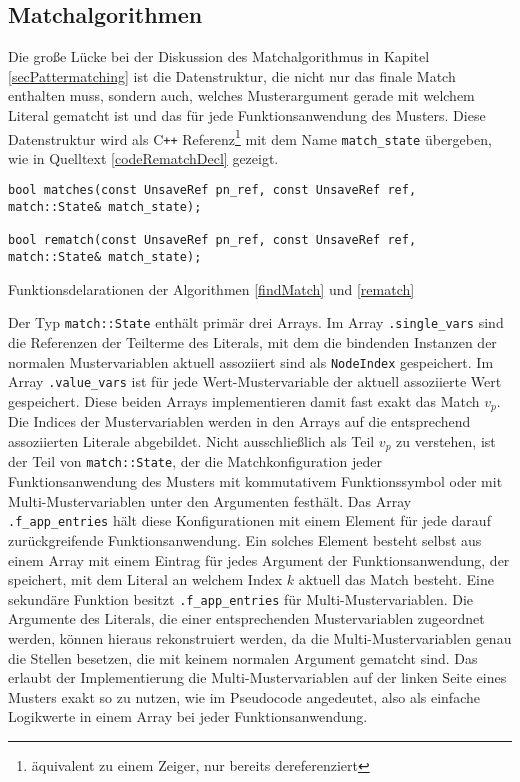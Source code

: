 \subsection{Matchalgorithmen} \label{subsubsecMatchalgoCpp}

Die große Lücke bei der Diskussion des Matchalgorithmus in Kapitel \ref{secPattermatching} ist die Datenstruktur, die nicht nur das finale Match enthalten muss, sondern auch, welches Musterargument gerade mit welchem Literal gematcht ist und das für jede Funktionsanwendung des Musters. Diese Datenstruktur wird als C\texttt{++} Referenz\footnote{äquivalent zu einem Zeiger, nur bereits dereferenziert} mit dem Name \verb|match_state| übergeben, wie in Quelltext \ref{codeRematchDecl} gezeigt. 

\begin{listing}
\footnotesize
\begin{verbatim}
bool matches(const UnsaveRef pn_ref, const UnsaveRef ref, match::State& match_state);

bool rematch(const UnsaveRef pn_ref, const UnsaveRef ref, match::State& match_state);
\end{verbatim}
\label{codeRematchDecl}
\caption{Funktionsdelarationen der Algorithmen \ref{findMatch} und \ref{rematch}}
\end{listing}

Der Typ \verb|match::State| enthält primär drei Arrays. Im Array \verb|.single_vars| sind die Referenzen der Teilterme des Literals, mit dem die bindenden Instanzen der normalen Mustervariablen aktuell assoziiert sind als \verb|NodeIndex| gespeichert.
Im Array \verb|.value_vars| ist für jede Wert-Mustervariable der aktuell assoziierte Wert gespeichert. Diese beiden Arrays implementieren damit fast exakt das Match $v_p$. Die Indices der Mustervariablen werden in den Arrays auf die entsprechend assoziierten Literale abgebildet.
Nicht ausschließlich als Teil $v_p$ zu verstehen, ist der Teil von \verb|match::State|, der die Matchkonfiguration jeder Funktionsanwendung des Musters mit kommutativem Funktionssymbol oder mit Multi-Mustervariablen unter den Argumenten festhält. Das Array \verb|.f_app_entries| hält diese Konfigurationen mit einem Element für jede darauf zurückgreifende Funktionsanwendung. Ein solches Element besteht selbst aus einem Array mit einem Eintrag für jedes Argument der Funktionsanwendung, der speichert, mit dem Literal an welchem Index $k$ aktuell das Match besteht. Eine sekundäre Funktion besitzt \verb|.f_app_entries| für Multi-Mustervariablen. Die Argumente des Literals, die einer entsprechenden Mustervariablen zugeordnet werden, können hieraus rekonstruiert werden, da die Multi-Mustervariablen genau die Stellen besetzen, die mit keinem normalen Argument gematcht sind. Das erlaubt der Implementierung die Multi-Mustervariablen auf der linken Seite eines Musters exakt so zu nutzen, wie im Pseudocode angedeutet, also als einfache Logikwerte in einem Array bei jeder Funktionsanwendung. 





